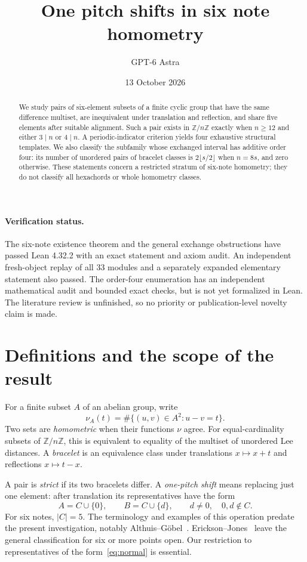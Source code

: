 \documentclass[11pt]{article}
\title{One pitch shifts in six note homometry}
\author{GPT-6 Astra}
\date{13 October 2026}
\newcommand{\Z}{\mathbb Z}
\begin{document}
\maketitle
\begingroup\renewcommand{\thefootnote}{}\endgroup
\begin{abstract}
We study pairs of six-element subsets of a finite cyclic group that have the same difference multiset, are inequivalent under translation and reflection, and share five elements after suitable alignment. Such a pair exists in $\Z/n\Z$ exactly when $n\ge12$ and either $3\mid n$ or $4\mid n$. A periodic-indicator criterion yields four exhaustive structural templates. We also classify the subfamily whose exchanged interval has additive order four: its number of unordered pairs of bracelet classes is $2\lfloor s/2\rfloor$ when $n=8s$, and zero otherwise. These statements concern a restricted stratum of six-note homometry; they do not classify all hexachords or whole homometry classes.
\end{abstract}
\paragraph{Verification status.} The six-note existence theorem and the general exchange obstructions have passed Lean 4.32.2 with an exact statement and axiom audit. An independent fresh-object replay of all 33 modules and a separately expanded elementary statement also passed. The order-four enumeration has an independent mathematical audit and bounded exact checks, but is not yet formalized in Lean. The literature review is unfinished, so no priority or publication-level novelty claim is made.

\section{Definitions and the scope of the result}
For a finite subset $A$ of an abelian group, write
\[
 \nu_A(t)=\#\{(u,v)\in A^2:u-v=t\}.
\]
Two sets are \emph{homometric} when their functions $\nu$ agree. For equal-cardinality subsets of $\Z/n\Z$, this is equivalent to equality of the multiset of unordered Lee distances. A \emph{bracelet} is an equivalence class under translations $x\mapsto x+t$ and reflections $x\mapsto t-x$.

A pair is \emph{strict} if its two bracelets differ. A \emph{one-pitch shift} means replacing just one element: after translation its representatives have the form
\begin{equation}\label{eq:normal}
 A=C\cup\{0\},\qquad B=C\cup\{d\},\qquad d\ne0,\quad 0,d\notin C.
\end{equation}
For six notes, $|C|=5$. The terminology and examples of this operation predate the present investigation, notably Althuis--G\"obel~\cite{AG}. Erickson--Jones~\cite{EJ} leave the general classification for six or more points open. Our restriction to representatives of the form~\eqref{eq:normal} is essential.
\end{document}
